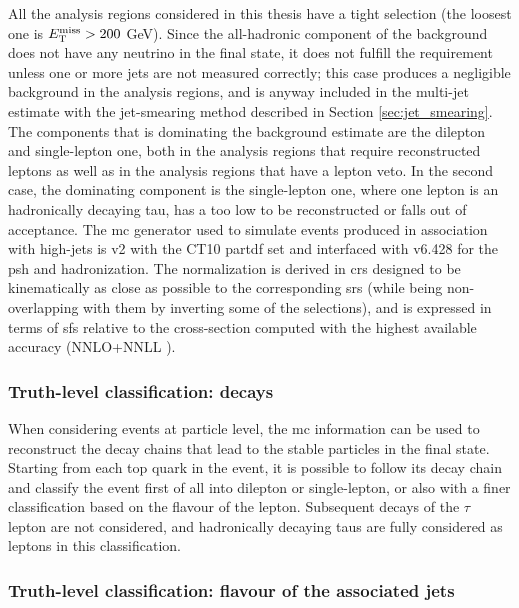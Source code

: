 All the analysis regions considered in this thesis have a tight \met selection (the loosest one is $E_{\rm T}^{\mathrm{miss}} > 200$ GeV). Since the all-hadronic component 
of the \ttbar background does not have any neutrino in the final state, it does not fulfill the \met requirement unless one or more jets are not measured correctly; this case produces a negligible background in the analysis regions, and is anyway included in the multi-jet estimate with the jet-smearing method described in Section \ref{sec:jet_smearing}.
The \ttbar components that is dominating the background estimate are the dilepton and single-lepton one, both in the analysis regions that require reconstructed leptons as well as in the analysis regions that have a lepton veto.
In the second case, the dominating component is the single-lepton one, where one lepton is an hadronically decaying tau, has a \pt too low to be reconstructed or falls out of acceptance. 
The \gls{mc} generator used to simulate \ttbar events produced in association with high-\pt jets is \PowhegBox v2 with the CT10 \gls{partdf} set \cite{Lai:2010vv} and interfaced with \PY v6.428 \cite{Sjostrand:2006za} for the \gls{psh} and hadronization. 
The normalization is derived in \glspl{cr} designed to be kinematically as close as possible to the corresponding \glspl{sr} (while being non-overlapping with them by inverting some of the selections), and is expressed in terms of \glspl{sf} relative to the cross-section computed with the highest
available accuracy (NNLO+NNLL \cite{Czakon:2011xx}).

\subsubsection*{Truth-level classification: \ttbar decays}

When considering events at particle level,
the \gls{mc} information can be used to reconstruct the decay chains that lead to the stable particles in the final state. 
Starting from each top quark in the event, it is possible to follow its decay chain and classify the event first of all into dilepton or single-lepton, or also with a finer classification based on the flavour of the lepton. 
Subsequent decays of the $\tau$ lepton are not considered, and hadronically decaying taus are fully considered as leptons in this classification. 

\subsubsection*{Truth-level classification: flavour of the associated jets}

